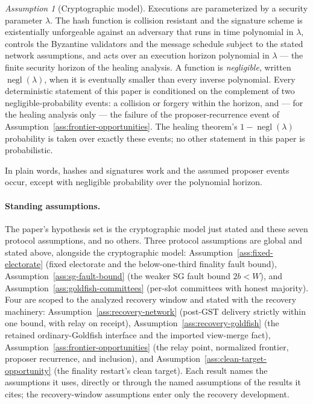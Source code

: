 \ifx\litemode\undefined\documentclass{article}\fi
\theoremstyle{plain}
\theoremstyle{definition}
\theoremstyle{remark}
\newtheorem{assumption}[theorem]{Assumption}
\newcommand{\GST}{\mathrm{GST}}
\begin{document}
\begin{assumption}[Cryptographic model]\label{ass:crypto}
Executions are parameterized by a security parameter \(\lambda\).
The hash function is collision resistant and the signature scheme is
existentially unforgeable against an adversary that runs in time
polynomial in \(\lambda\), controls the Byzantine validators and the
message schedule subject to the stated network assumptions, and acts
over an execution horizon polynomial in \(\lambda\) --- the finite
security horizon of the healing analysis.  A function is
\emph{negligible}, written \(\operatorname{negl}(\lambda)\), when
it is eventually smaller than every inverse polynomial.  Every
deterministic statement of this paper is conditioned on the complement
of two negligible-probability events: a collision or forgery within
the horizon, and --- for the healing analysis only --- the failure of
the proposer-recurrence event of
Assumption~\ref{ass:frontier-opportunities}.  The healing theorem's
\(1-\operatorname{negl}(\lambda)\) probability is taken over
exactly these events; no other statement in this paper is
probabilistic.

In plain words, hashes and signatures work and the assumed proposer
events occur, except with negligible probability over the polynomial
horizon.
\end{assumption}

\paragraph{Standing assumptions.}
The paper's hypothesis set is the cryptographic model just stated and
these seven protocol assumptions, and no others.  Three protocol
assumptions are global and stated above, alongside the cryptographic
model:
Assumption~\ref{ass:fixed-electorate} (fixed electorate and the
below-one-third finality fault bound),
Assumption~\ref{ass:sg-fault-bound} (the weaker SG fault bound
\(2b<W\)), and Assumption~\ref{ass:goldfish-committees} (per-slot
committees with honest majority).  Four are scoped to the analyzed
recovery window and stated with the recovery machinery:
Assumption~\ref{ass:recovery-network} (post-\(\GST\) delivery
strictly within one bound, with relay on receipt),
Assumption~\ref{ass:recovery-goldfish} (the retained ordinary-Goldfish
interface and the imported view-merge fact),
Assumption~\ref{ass:frontier-opportunities} (the relay point,
normalized frontier, proposer recurrence, and inclusion), and
Assumption~\ref{ass:clean-target-opportunity} (the finality restart's
clean target).  Each result names the assumptions it uses, directly or through the
named assumptions of the results it cites; the recovery-window
assumptions enter only the recovery development.
\end{document}
